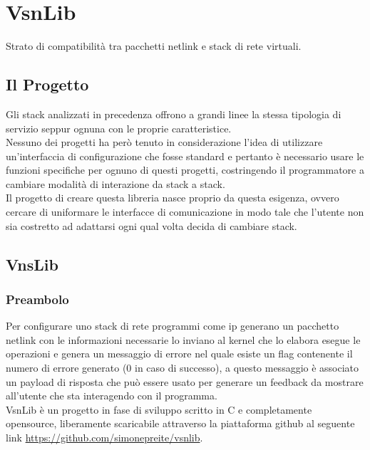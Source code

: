

\chapter{VsnLib}                %
\lhead[\fancyplain{}{\bfseries\thepage}]{\fancyplain{}{\bfseries\rightmark}}
Strato di compatibilit\`a tra pacchetti netlink e stack di rete virtuali.

\section{Il Progetto}                 %
Gli stack analizzati in precedenza offrono a grandi linee la stessa tipologia di servizio seppur ognuna con le proprie caratteristice.\\
Nessuno dei progetti ha per\`o tenuto in considerazione l'idea di utilizzare un'interfaccia di configurazione che fosse standard e pertanto \`e necessario usare le funzioni specifiche per ognuno di questi progetti, costringendo il programmatore a cambiare modalit\`a di interazione da stack a stack.\\
Il progetto di creare questa libreria nasce proprio da questa esigenza, ovvero cercare di uniformare le interfacce di comunicazione in modo tale che l'utente non sia costretto ad adattarsi ogni qual volta decida di cambiare stack.\\
\section{VnsLib}
\subsection{Preambolo}
Per configurare uno stack di rete programmi come ip generano un pacchetto netlink con le informazioni necessarie lo inviano al kernel che lo elabora esegue le operazioni e genera un messaggio di errore nel quale esiste un flag contenente il numero di errore generato (0 in caso di successo), a questo messaggio \`e associato un payload di risposta che pu\`o essere usato per generare un feedback da mostrare all'utente che sta interagendo con il programma.\\
VsnLib \`e un progetto in fase di sviluppo scritto in C e completamente opensource, liberamente scaricabile attraverso la piattaforma github al seguente link \url{https://github.com/simonepreite/vsnlib}.

